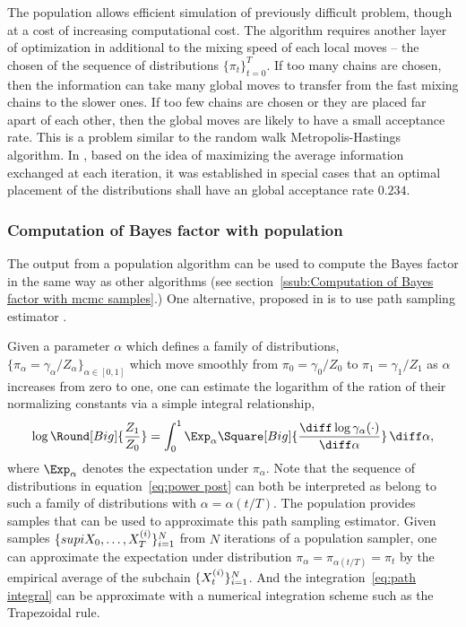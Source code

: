 The population \mcmc allows efficient simulation of previously difficult
problem, though at a cost of increasing computational cost. The algorithm
requires another layer of optimization in additional to the mixing speed of
each local moves -- the chosen of the sequence of distributions
$\{\pi_t\}_{t=0}^T$. If too many chains are chosen, then the information can
take many global moves to transfer from the fast mixing chains to the slower
ones. If too few chains are chosen or they are placed far apart of each other,
then the global moves are likely to have a small acceptance rate. This is a
problem similar to the random walk Metropolis-Hastings algorithm. In
\cite{Atchade:2010ha}, based on the idea of maximizing the average information
exchanged at each iteration, it was established in special cases that an
optimal placement of the distributions shall have an global acceptance rate
$0.234$.

\subsubsection{Computation of Bayes factor with population \protect\mcmc}
\label{ssub:Computation of Bayes factor with population mcmc}

The output from a population \mcmc algorithm can be used to compute the Bayes
factor in the same way as other \mcmc algorithms (see
section~\ref{ssub:Computation of Bayes factor with mcmc samples}.) One
alternative, proposed in \cite{Calderhead:2009bd} is to use path sampling
estimator \cite{Gelman:1998ei}.

Given a parameter $\alpha$ which defines a family of distributions,
$\{\pi_{\alpha} = \gamma_{\alpha}/Z_{\alpha}\}_{\alpha\in[0,1]}$ which move
smoothly from $\pi_0 = \gamma_0/Z_0$ to $\pi_1 = \gamma_1/Z_1$ as $\alpha$
increases from zero to one, one can estimate the logarithm of the ration of
their normalizing constants via a simple integral relationship,
\begin{equation}
  \log\Round[Big]{\frac{Z_1}{Z_0}} = \int_0^1\Exp_{\alpha}\Square[Big]{
    \frac{\diff\log\gamma_{\alpha}(\cdot)}{\diff\alpha}}\intd\alpha,
  \label{eq:path integral}
\end{equation}
where $\Exp_{\alpha}$ denotes the expectation under $\pi_{\alpha}$. Note that
the sequence of distributions in equation~\eqref{eq:power post} can both be
interpreted as belong to such a family of distributions with $\alpha =
\alpha(t/T)$. The population \mcmc provides samples that can be used to
approximate this path sampling estimator. Given samples
$\{supi{X_0},\dots,X_T^{(i)}\}_{i=1}^N$ from $N$ iterations of a population
\mcmc sampler, one can approximate the expectation under distribution
$\pi_{\alpha} = \pi_{\alpha(t/T)} = \pi_t$ by the empirical average of the
subchain $\{X_t^{(i)}\}_{i=1}^N$. And the integration~\eqref{eq:path
  integral} can be approximate with a numerical integration scheme such as
the Trapezoidal rule.

